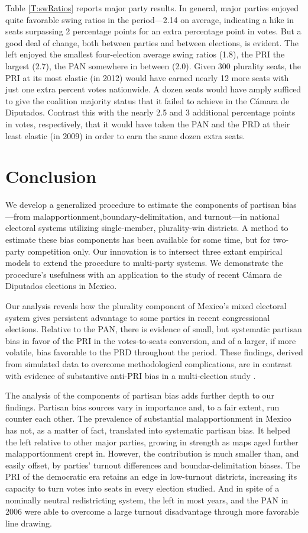 \documentclass[letter,12pt]{article}
\begin{document}
Table \ref{T:swRatios} reports major party results. In general, major parties enjoyed quite favorable swing ratios in the period---2.14 on average, indicating a hike in seats surpassing 2 percentage points for an extra percentage point in votes. But a good deal of change, both between parties and between elections, is evident. The left enjoyed the smallest four-election average swing ratios (1.8), the PRI the largest (2.7), the PAN somewhere in between (2.0). Given 300 plurality seats, the PRI at its most elastic (in 2012) would have earned nearly 12 more seats with just one extra percent votes nationwide. A dozen seats would have amply sufficed to give the coalition majority status that it failed to achieve in the C\'amara de Diputados. Contrast this with the nearly 2.5 and 3 additional percentage points in votes, respectively, that it would have taken the PAN and the PRD at their least elastic (in 2009) in order to earn the same dozen extra seats. 


\section{Conclusion}

We develop a generalized procedure to estimate the components of partisan bias---from malapportionment,boundary-delimitation, and  turnout---in national electoral systems utilizing single-member, plurality-win districts. A method to estimate these bias components has been available for some time, but for two-party competition only. Our innovation is to intersect three extant empirical models to extend the procedure to multi-party systems. We demonstrate the procedure's usefulness with an application to the study of recent C\'amara de Diputados elections in Mexico. 

Our analysis reveals how the plurality component of Mexico's mixed electoral system gives persistent advantage to some parties in recent congressional elections. Relative to the PAN, there is evidence of small, but systematic partisan bias in favor of the PRI in the votes-to-seats conversion, and of a larger, if more volatile, bias favorable to the PRD throughout the period. These findings, derived from simulated data to overcome methodological complications, are in contrast with evidence of substantive anti-PRI bias in a multi-election study \citep{marquez2014biasBlog}. 

The analysis of the components of partisan bias adds further depth to our findings. Partisan bias sources vary in importance and, to a fair extent, run counter each other. The prevalence of substantial malapportionment in Mexico has not, as a matter of fact, translated into systematic partisan bias. It helped the left relative to other major parties, growing in strength as maps aged further malapportionment crept in. However, the contribution is much smaller than, and easily offset, by parties' turnout differences and boundar-delimitation biases. The PRI of the democratic era retains an edge in low-turnout districts, increasing its capacity to turn votes into seats in every election studied. And in spite of a nominally neutral redistricting system, the left in most years, and the PAN in 2006 were able to overcome a large turnout disadvantage through more favorable line drawing. 
\end{document}
